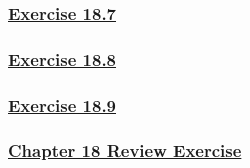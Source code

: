 \documentclass[
  11pt,
]{book}
\begin{document}
\subsubsection*{\texorpdfstring{\hyperref[ex187q]{Exercise 18.7}}{Exercise 18.7}}\label{exercise-18.7-1}

\subsubsection*{\texorpdfstring{\hyperref[ex188q]{Exercise 18.8}}{Exercise 18.8}}\label{exercise-18.8-1}

\subsubsection*{\texorpdfstring{\hyperref[ex189q]{Exercise 18.9}}{Exercise 18.9}}\label{exercise-18.9-1}

\subsubsection*{\texorpdfstring{\hyperref[re18q]{Chapter 18 Review Exercise}}{Chapter 18 Review Exercise}}\label{chapter-18-review-exercise}


\end{document}
